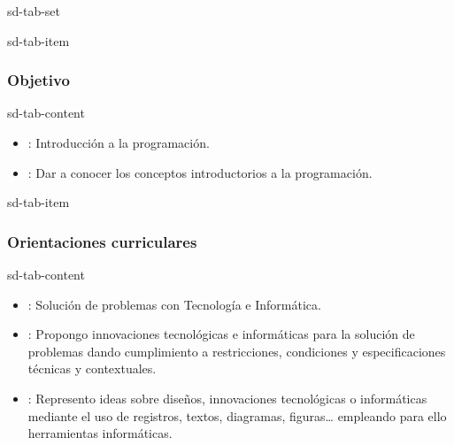 \documentclass[letterpaper,10pt,spanish]{sphinxmanual}
\begin{document}
\begin{sphinxuseclass}{sd-tab-set}
\begin{sphinxuseclass}{sd-tab-item}\subsubsection*{Objetivo}

\begin{sphinxuseclass}{sd-tab-content}
\sphinxAtStartPar
{}
\begin{itemize}
\item {} 
\sphinxAtStartPar
{}: Introducción a la programación.

\item {} 
\sphinxAtStartPar
{}: Dar a conocer los conceptos introductorios a la programación.

\end{itemize}

\end{sphinxuseclass}
\end{sphinxuseclass}
\begin{sphinxuseclass}{sd-tab-item}\subsubsection*{Orientaciones curriculares}

\begin{sphinxuseclass}{sd-tab-content}\begin{itemize}
\item {} 
\sphinxAtStartPar
{}: Solución de problemas con Tecnología e Informática.

\item {} 
\sphinxAtStartPar
{}: Propongo innovaciones tecnológicas e informáticas para la solución de problemas dando cumplimiento a restricciones, condiciones y especificaciones técnicas y contextuales.

\item {} 
\sphinxAtStartPar
{}: Represento ideas sobre diseños, innovaciones tecnológicas o informáticas mediante el uso de registros, textos, diagramas, figuras… empleando para ello herramientas informáticas.


\end{itemize}
\end{sphinxuseclass}
\end{sphinxuseclass}
\end{sphinxuseclass}
\end{document}

